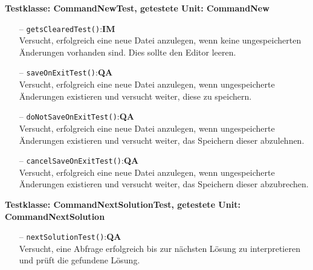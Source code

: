 \documentclass[parskip=full,11pt,twoside]{scrartcl}
\def\qa{\hfill\textbf{QA}}
\def\impl{\hfill\textbf{IM}}
\begin{document}
\textbf{Testklasse: CommandNewTest, getestete Unit: CommandNew}
\begin{itemize}
	\item[--] \texttt{getsClearedTest()}:\impl\\
	Versucht, erfolgreich eine neue Datei anzulegen, wenn keine ungespeicherten Änderungen vorhanden sind. Dies sollte den Editor leeren.
	\item[--] \texttt{saveOnExitTest()}:\qa\\
	Versucht, erfolgreich eine neue Datei anzulegen, wenn ungespeicherte Änderungen existieren und versucht weiter, diese zu speichern.
	\item[--] \texttt{doNotSaveOnExitTest()}:\qa\\
	Versucht, erfolgreich eine neue Datei anzulegen, wenn ungespeicherte Änderungen existieren und versucht weiter, das Speichern dieser abzulehnen.
	\item[--] \texttt{cancelSaveOnExitTest()}:\qa\\
	Versucht, erfolgreich eine neue Datei anzulegen, wenn ungespeicherte Änderungen existieren und versucht weiter, das Speichern dieser abzubrechen.
\end{itemize}

\textbf{Testklasse: CommandNextSolutionTest, getestete Unit: CommandNextSolution}
\begin{itemize}
	\item[--] \texttt{nextSolutionTest()}:\qa\\
	Versucht, eine Abfrage erfolgreich bis zur nächsten Lösung zu interpretieren und prüft die gefundene Lösung.
\end{itemize}
\end{document}
